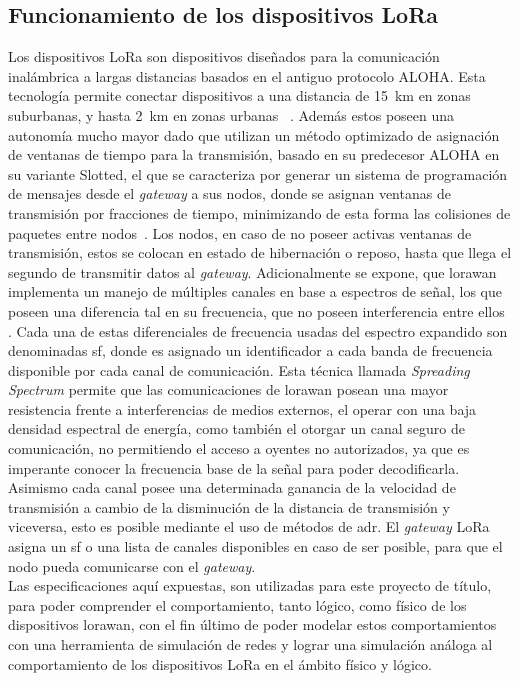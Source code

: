 \begin{justify}
\section{Funcionamiento de los dispositivos LoRa}
Los dispositivos LoRa son dispositivos diseñados para la comunicación inalámbrica a largas distancias basados en el antiguo protocolo ALOHA. Esta tecnología permite conectar dispositivos a una distancia de \SI{15}{\kilo\meter} en zonas suburbanas, y hasta \SI{2}{\kilo\meter} en zonas urbanas \cite{Sornin}~\cite{Sornin2}. Además estos poseen una autonomía mucho mayor dado que utilizan un método optimizado de asignación de ventanas de tiempo para la transmisión, basado en su predecesor ALOHA en su variante Slotted, el que se caracteriza por generar un sistema de programación de mensajes desde el \textit{gateway} a sus nodos, donde se asignan ventanas de transmisión por fracciones de tiempo, minimizando de esta forma las colisiones de paquetes entre nodos~\cite{NORMAN}. Los nodos, en caso de no poseer activas ventanas de transmisión, estos se colocan en estado de hibernación o reposo, hasta que llega el segundo de transmitir datos al \textit{gateway}. Adicionalmente se expone, que \gls{lorawan} implementa un manejo de múltiples canales en base a espectros de señal, los que poseen una diferencia tal en su frecuencia, que no poseen interferencia entre ellos \cite{modulation}. Cada una de estas diferenciales de frecuencia usadas del espectro expandido son denominadas \gls{sf}, donde es asignado un identificador a cada banda de frecuencia disponible por cada canal de comunicación. Esta técnica llamada \textit{Spreading Spectrum} permite que las comunicaciones de \gls{lorawan} posean una mayor resistencia frente a interferencias de medios externos, el operar con una baja densidad espectral de energía, como también el otorgar un canal seguro de comunicación, no permitiendo el acceso a oyentes no autorizados, ya que es imperante conocer la frecuencia base de la señal para poder decodificarla. Asimismo cada canal posee una determinada ganancia de la velocidad de transmisión a cambio de la disminución de la distancia de transmisión y viceversa, esto es posible mediante el uso de métodos de \gls{adr}. El \textit{gateway} LoRa asigna un \gls{sf} o una lista de canales disponibles en caso de ser posible, para que el nodo pueda comunicarse con el \textit{gateway}.\\
Las especificaciones aquí expuestas, son utilizadas para este proyecto de título, para poder comprender el comportamiento, tanto lógico, como físico de los dispositivos \gls{lorawan}, con el fin último de poder modelar estos comportamientos con una herramienta de simulación de redes y lograr una simulación análoga al comportamiento de los dispositivos LoRa en el ámbito físico y lógico.


\end{justify}
